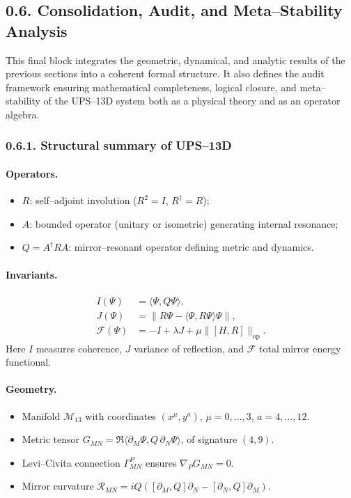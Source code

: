 \subsection*{0.6. Consolidation, Audit, and Meta–Stability Analysis}

\noindent
This final block integrates the geometric, dynamical, and analytic results of the previous sections
into a coherent formal structure.
It also defines the audit framework ensuring mathematical completeness, logical closure,
and meta–stability of the UPS–13D system both as a physical theory and as an operator algebra.

\subsubsection*{0.6.1. Structural summary of UPS–13D}

\paragraph{Operators.}
\begin{itemize}
  \item $R$: self–adjoint involution ($R^2=I$, $R^\dagger=R$);
  \item $A$: bounded operator (unitary or isometric) generating internal resonance;
  \item $Q=A^\dagger R A$: mirror–resonant operator defining metric and dynamics.
\end{itemize}

\paragraph{Invariants.}
\begin{align*}
I(\Psi)&=\langle\Psi,Q\Psi\rangle,\\
J(\Psi)&=\|R\Psi-\langle\Psi,R\Psi\rangle\Psi\|,\\
\mathcal{F}(\Psi)&=-I+\lambda J+\mu\|[H,R]\|_{\mathrm{op}}.
\end{align*}
Here $I$ measures coherence, $J$ variance of reflection, and $\mathcal{F}$ total mirror energy functional.

\paragraph{Geometry.}
\begin{itemize}
  \item Manifold $\mathcal{M}_{13}$ with coordinates $(x^\mu,y^a)$, $\mu=0,\dots,3$, $a=4,\dots,12$.
  \item Metric tensor $G_{MN}=\Re\langle\partial_M\Psi,Q\,\partial_N\Psi\rangle$,
    of signature $(4,9)$.
  \item Levi–Civita connection $\Gamma^P_{MN}$ ensures $\nabla_P G_{MN}=0$.
  \item Mirror curvature $\mathcal{R}_{MN}=iQ([\partial_M,Q]\partial_N-[\partial_N,Q]\partial_M)$.
\end{itemize}

